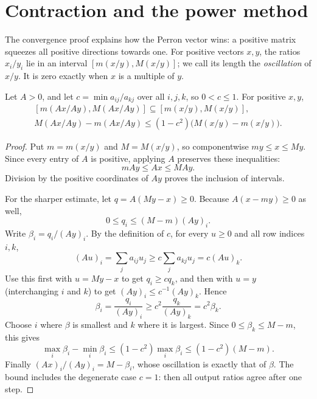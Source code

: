 \section{Contraction and the power method}

The convergence proof explains how the Perron vector wins: a positive matrix squeezes all positive directions towards one.
For positive vectors $x,y$, the ratios $x_i/y_i$ lie in an interval $[m(x/y),M(x/y)]$; we call its length the
\emph{oscillation} of $x/y$. It is zero exactly when $x$ is a multiple of $y$.

\begin{lemma}\label{linear:lem:oscillation}
Let $A>0$, and let $c=\min a_{ij}/a_{kj}$ over all $i,j,k$, so $0<c\le1$. For positive $x,y$,
\[
\begin{gathered}
[m(Ax/Ay),M(Ax/Ay)]\subseteq[m(x/y),M(x/y)],\\
M(Ax/Ay)-m(Ax/Ay)\le(1-c^2)\bigl(M(x/y)-m(x/y)\bigr).
\end{gathered}
\]
\end{lemma}
\begin{proof}
Put $m=m(x/y)$ and $M=M(x/y)$, so componentwise
$my\le x\le My$. Since every entry of $A$ is
positive, applying $A$ preserves these inequalities:
\[
mAy\le Ax\le MAy.
\]
Division by the positive coordinates of $Ay$ proves
the inclusion of intervals.

For the sharper estimate, let $q=A(My-x)\ge0$.
Because $A(x-my)\ge0$ as well,
\[
0\le q_i\le(M-m)(Ay)_i.
\]
Write $\beta_i=q_i/(Ay)_i$. By the definition of
$c$, for every $u\ge0$ and all row indices $i,k$,
\[
(Au)_i=\sum_j a_{ij}u_j
 \ge c\sum_j a_{kj}u_j=c(Au)_k.
\]
Use this first with $u=My-x$ to get $q_i\ge cq_k$,
and then with $u=y$ (interchanging $i$ and $k$)
to get $(Ay)_i\le c^{-1}(Ay)_k$. Hence
\[
\beta_i=\frac{q_i}{(Ay)_i}
 \ge c^2\frac{q_k}{(Ay)_k}=c^2\beta_k.
\]
Choose $i$ where $\beta$ is smallest and $k$
where it is largest. Since
$0\le\beta_k\le M-m$, this gives
\[
\max_i\beta_i-\min_i\beta_i
 \le(1-c^2)\max_i\beta_i
 \le(1-c^2)(M-m).
\]
Finally $(Ax)_i/(Ay)_i=M-\beta_i$, whose
oscillation is exactly that of $\beta$.
The bound includes the degenerate case $c=1$:
then all output ratios agree after one step.
\end{proof}

